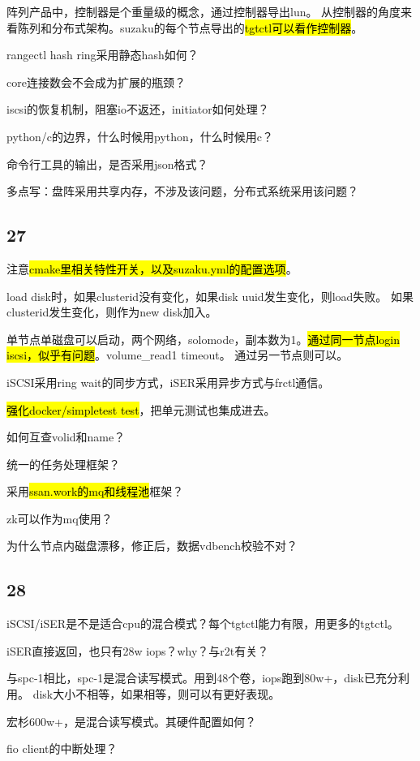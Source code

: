 阵列产品中，控制器是个重量级的概念，通过控制器导出lun。
从控制器的角度来看陈列和分布式架构。suzaku的每个节点导出的\hl{tgtctl可以看作控制器}。

rangectl hash ring采用静态hash如何？

core连接数会不会成为扩展的瓶颈？

iscsi的恢复机制，阻塞io不返还，initiator如何处理？

python/c的边界，什么时候用python，什么时候用c？

命令行工具的输出，是否采用json格式？

多点写：盘阵采用共享内存，不涉及该问题，分布式系统采用该问题？

\subsection{27}

注意\hl{cmake里相关特性开关，以及suzaku.yml的配置选项}。

load disk时，如果clusterid没有变化，如果disk uuid发生变化，则load失败。
如果clusterid发生变化，则作为new disk加入。

单节点单磁盘可以启动，两个网络，solomode，副本数为1。\hl{通过同一节点login iscsi，似乎有问题}。volume\_read1 timeout。
通过另一节点则可以。

iSCSI采用ring wait的同步方式，iSER采用异步方式与frctl通信。

\hl{强化docker/simpletest test}，把单元测试也集成进去。

如何互查volid和name？

统一的任务处理框架？

采用\hl{ssan.work的mq和线程池}框架？

zk可以作为mq使用？

为什么节点内磁盘漂移，修正后，数据vdbench校验不对？

\subsection{28}

iSCSI/iSER是不是适合cpu的混合模式？每个tgtctl能力有限，用更多的tgtctl。

iSER直接返回，也只有28w iops？why？与r2t有关？

与spc-1相比，spc-1是混合读写模式。用到48个卷，iops跑到80w+，disk已充分利用。
disk大小不相等，如果相等，则可以有更好表现。

宏杉600w+，是混合读写模式。其硬件配置如何？

fio client的中断处理？

